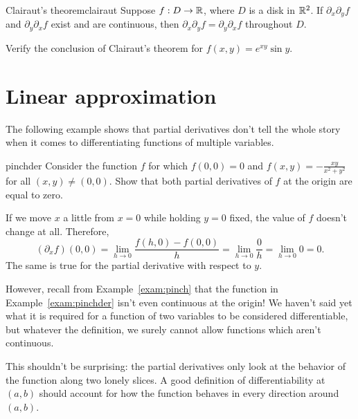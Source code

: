 \documentclass[svgnames]{watsonbook}
\begin{document}
\begin{theo}{Clairaut's theorem}{clairaut}
  Suppose $f:D \to \mathbb{R}$, where $D$ is a disk in $\mathbb{R}^2$. If
  $\partial_x \partial_y f$ and $\partial_y \partial_x f$ exist and
  are continuous, then $\partial_x \partial_y f = \partial_y
  \partial_x f$ throughout $D$. 
\end{theo}

\begin{exercise}{}{}
  Verify the conclusion of Clairaut's theorem for $f(x,y) = e^{xy}
  \sin y$. 
\end{exercise}

\section{Linear approximation} \label{sec:linapprox} 


The following example shows that partial derivatives don't tell the
whole story when it comes to differentiating functions of multiple
variables.

\begin{example}{}{pinchder}
  Consider the function $f$ for which $f(0,0)=0$ and $f(x,y) =
  -\frac{xy}{x^2 + y^2}$ for all $(x,y) \neq (0,0)$. Show that both
  partial derivatives of $f$ at the origin are equal to zero. 
  \end{example}

  \begin{solution}
    If we move $x$ a little from $x=0$ while holding $y=0$ fixed, the
    value of $f$ doesn't change at all. Therefore,
    \[
      (\partial_x f)(0,0) = \lim_{h \to 0} \frac{f(h,0) - f(0,0)}{h} =
      \lim_{h \to 0} \frac{0}{h} =  \lim_{h \to 0} 0 = 0. 
    \]
    The same is true for the partial derivative with respect to $y$. 
  \end{solution}

  However, recall from Example~\ref{exam:pinch} that the function in
  Example~\ref{exam:pinchder} isn't even continuous at the origin! We
  haven't said yet what it is required for a function of two variables to be
  considered differentiable, but whatever the definition, we surely cannot allow
  functions which aren't continuous. 

  This shouldn't be surprising: the partial derivatives only look at
  the behavior of the function along two lonely slices. A good
  definition of differentiability at $(a,b)$ should account for how the
  function behaves in every direction around $(a,b)$.
\end{document}
